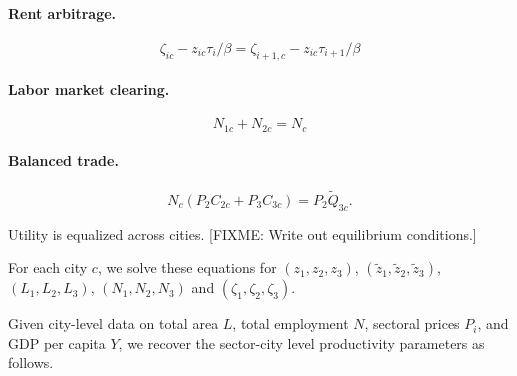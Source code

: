 \documentclass[12pt]{article}
\begin{document}
\paragraph{Rent arbitrage.}
\begin{equation}\label{eq:rent_arbitrage}
	\zeta_{ic} - z_{ic} \tau_i/\beta
	=
	\zeta_{i+1,c} - z_{ic} \tau_{i+1}/\beta
\end{equation}
\paragraph{Labor market clearing.}
\begin{equation}\label{eq:labor_market_clearing}
	N_{1c}+N_{2c} = N_c
\end{equation}
\paragraph{Balanced trade.}
\begin{equation}\label{eq:balanced_trade}
N_c(P_2C_{2c} + P_3 C_{3c}) = P_2 \tilde Q_{3c}.
\end{equation}
    \item Utility is equalized across cities. 
[FIXME: Write out equilibrium conditions.]

For each city $c$, we solve these equations for $(z_1,z_2,z_3)$, $(\tilde z_1,\tilde z_2,\tilde z_3)$, $(L_1,L_2,L_3)$, $(N_1,N_2,N_3)$ and $(\zeta_1,\zeta_2,\zeta_3)$.

Given city-level data on total area $L$, total employment $N$, sectoral prices $P_i$, and GDP per capita $Y$, we recover the sector-city level productivity parameters as follows. 
\end{document}
